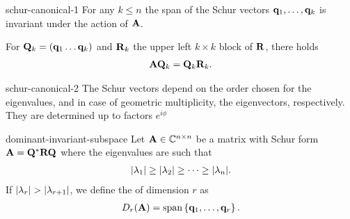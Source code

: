 \begin{Lemma}{schur-canonical-1}
  For any $k\le n$ the span of the Schur vectors
  $\mathbf q_1,\dots,\mathbf q_k$ is invariant under the action of $\mathbf A$.

  For $\mathbf Q_k = (\mathbf q_1\dots\mathbf q_k)$ and $\mathbf R_k$ the upper left $k\times k$ block of $\mathbf R$, there holds
  \begin{gather}
    \mathbf A\mathbf Q_k = \mathbf Q_k \mathbf R_k.
  \end{gather}
\end{Lemma}

\begin{Lemma}{schur-canonical-2}
  The Schur vectors depend on the order chosen for the eigenvalues,
  and in case of geometric multiplicity, the eigenvectors,
  respectively. They are determined up to factors $e^{i\phi}$
\end{Lemma}

\begin{Definition}{dominant-invariant-subspace}
  Let $\mathbf A\in\mathbb C^{n\times n}$ be a matrix with Schur form
  $\mathbf A = \mathbf Q^*\mathbf R\mathbf Q$ where the eigenvalues are such that
  \begin{gather}
    \lvert\lambda_1\rvert\ge\lvert\lambda_2\rvert\ge\dots\ge\lvert\lambda_n\rvert.
  \end{gather}
  If $\lvert\lambda_r\rvert>\lvert\lambda_{r+1}\rvert$, we define the
   of dimension $r$ as
  \begin{gather}
    D_r(\mathbf A) = \operatorname{span}\left\{\mathbf q_1,\dots,\mathbf q_r\right\}.
  \end{gather}
\end{Definition}

